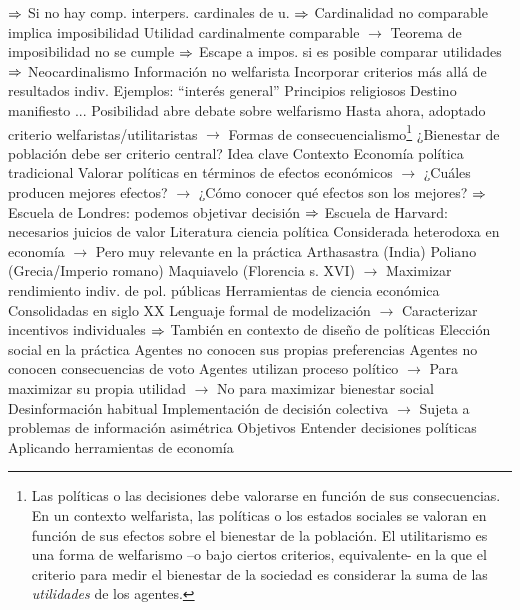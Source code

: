 \documentclass{nuevotema}
\begin{document}
\begin{esquemal}
				\4[] $\Rightarrow$ Si no hay comp. interpers. cardinales de u.
				\4[] $\Rightarrow$ Cardinalidad no comparable implica imposibilidad
				\4 Utilidad cardinalmente comparable
				\4[] $\to$ Teorema de imposibilidad no se cumple
				\4[] $\Rightarrow$ Escape a impos. si es posible comparar utilidades
				\4[] $\Rightarrow$ Neocardinalismo
			\3 Información no welfarista
				\4 Incorporar criterios más allá de resultados indiv.
				\4 Ejemplos:
				\4[] ``interés general''
				\4[] Principios religiosos
				\4[] Destino manifiesto
				\4[] ...
				\4 Posibilidad abre debate sobre welfarismo
				\4[] Hasta ahora, adoptado criterio welfaristas/utilitaristas
				\4[] $\to$ Formas de consecuencialismo\footnote{Las políticas o las decisiones debe valorarse en función de sus consecuencias. En un contexto welfarista, las políticas o los estados sociales se valoran en función de sus efectos sobre el bienestar de la población. El utilitarismo es una forma de welfarismo --o bajo ciertos criterios, equivalente- en la que el criterio para medir el bienestar de la sociedad es considerar la suma de las \textit{utilidades} de los agentes.}
				\4[] ¿Bienestar de población debe ser criterio central?
	\1 
		\2 Idea clave
			\3 Contexto
				\4 Economía política tradicional
				\4[] Valorar políticas en términos de efectos económicos
				\4[] $\to$ ¿Cuáles producen mejores efectos?
				\4[] $\to$ ¿Cómo conocer qué efectos son los mejores?
				\4[] $\Rightarrow$ Escuela de Londres: podemos objetivar decisión
				\4[] $\Rightarrow$ Escuela de Harvard: necesarios juicios de valor
				\4 Literatura ciencia política
				\4[] Considerada heterodoxa en economía
				\4[] $\to$ Pero muy relevante en la práctica
				\4[] Arthasastra (India)
				\4[] Poliano (Grecia/Imperio romano)
				\4[] Maquiavelo (Florencia s. XVI)
				\4[] $\to$ Maximizar rendimiento indiv. de pol. públicas
				\4 Herramientas de ciencia económica
				\4[] Consolidadas en siglo XX
				\4[] Lenguaje formal de modelización
				\4[] $\to$ Caracterizar incentivos individuales
				\4[] $\Rightarrow$ También en contexto de diseño de políticas
				\4 Elección social en la práctica
				\4[] Agentes no conocen sus propias preferencias
				\4[] Agentes no conocen consecuencias de voto
				\4[] Agentes utilizan proceso político
				\4[] $\to$ Para maximizar su propia utilidad
				\4[] $\to$ No para maximizar bienestar social
				\4[] Desinformación habitual
				\4[] Implementación de decisión colectiva
				\4[] $\to$ Sujeta a problemas de información asimétrica
			\3 Objetivos
				\4 Entender decisiones políticas
				\4[] Aplicando herramientas de economía

\end{esquemal}
\end{document}

